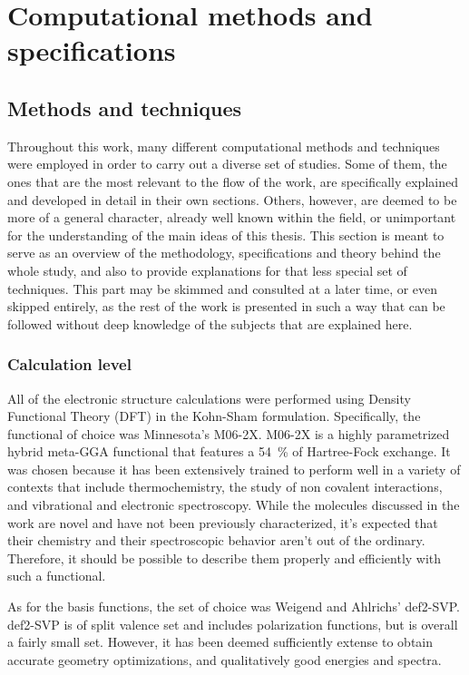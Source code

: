 \chapter{Computational methods and specifications}

\section{Methods and techniques}

Throughout this work, many different computational methods and techniques were employed in order to carry out a diverse set of studies.
Some of them, the ones that are the most relevant to the flow of the work, are specifically explained and developed in detail in their own sections.
Others, however, are deemed to be more of a general character, already well known within the field, or unimportant for the understanding of the main ideas of this thesis.
This section is meant to serve as an overview of the methodology, specifications and theory behind the whole study, and also to provide explanations for that less special set of techniques.
This part may be skimmed and consulted at a later time, or even skipped entirely, as the rest of the work is presented in such a way that can be followed without deep knowledge of the subjects that are explained here.

\subsection{Calculation level}
All of the electronic structure calculations were performed using Density Functional Theory (DFT) in the Kohn-Sham formulation.
Specifically, the functional of choice was Minnesota's M06-2X.
M06-2X is a highly parametrized hybrid meta-GGA functional that features a \SI{54}{\percent} of Hartree-Fock exchange.
It was chosen because it has been extensively trained to perform well in a variety of contexts that include thermochemistry, the study of non covalent interactions, and vibrational and electronic spectroscopy.
While the molecules discussed in the work are novel and have not been previously characterized, it's expected that their chemistry and their spectroscopic behavior aren't out of the ordinary.
Therefore, it should be possible to describe them properly and efficiently with such a functional.

As for the basis functions, the set of choice was Weigend and Ahlrichs' def2-SVP.
def2-SVP is of split valence set and includes polarization functions, but is overall a fairly small set.
However, it has been deemed sufficiently extense to obtain accurate geometry optimizations, and qualitatively good energies and spectra.

